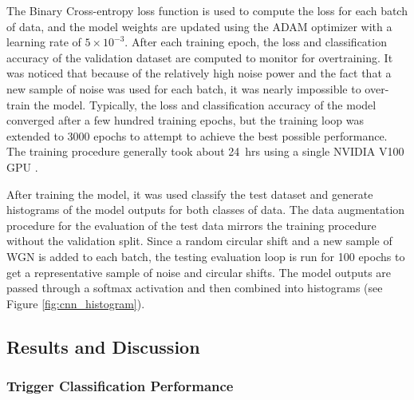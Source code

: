 The Binary Cross-entropy loss function is used to compute the loss for each batch of data, and the model weights are updated using the ADAM optimizer with a learning rate of $5\times10^{-3}$. After each training epoch, the loss and classification accuracy of the validation dataset are computed to monitor for overtraining. It was noticed that because of the relatively high noise power and the fact that a new sample of noise was used for each batch, it was nearly impossible to over-train the model. Typically, the loss and classification accuracy of the model converged after a few hundred training epochs, but the training loop was extended to 3000 epochs to attempt to achieve the best possible performance. The training procedure generally took about 24~hrs using a single NVIDIA V100 GPU \cite{v100}.

After training the model, it was used classify the test dataset and generate histograms of the model outputs for both classes of data. The data augmentation procedure for the evaluation of the test data mirrors the training procedure without the validation split. Since a random circular shift and a new sample of WGN is added to each batch, the testing evaluation loop is run for 100 epochs to get a representative sample of noise and circular shifts. The model outputs are passed through a softmax activation and then combined into histograms (see Figure \ref{fig:cnn_histogram}).

\subsection{Results and Discussion}
\label{sec:results}

\subsubsection{Trigger Classification Performance}

